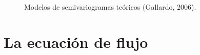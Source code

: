 \begin{figure}[htbp]
\centering
{}
\caption{Modelos de semivariogramas teóricos (Gallardo, 2006).} \label{fig:lego}
\end{figure} 

\section{La ecuación de flujo }

